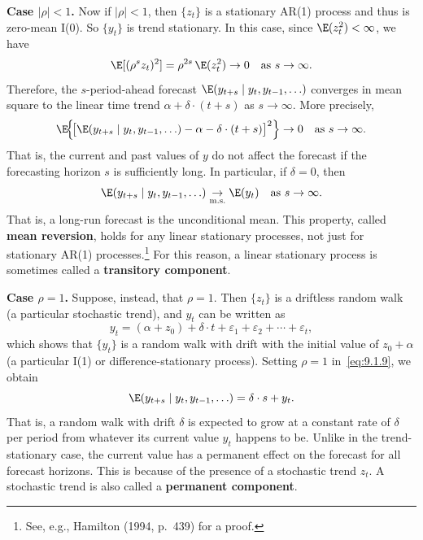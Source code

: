 \begin{enumerate}
\textbf{Case $|\rho| < 1$.} \enspace Now if $|\rho| < 1$, then $\{z_t\}$ is a stationary AR(1) process
and thus is zero-mean I(0). So $\{y_t\}$ is trend stationary. In this case, since
$\E(z_t^2) < \infty$, we have
\[
\E[(\rho^s z_t)^2] = \rho^{2s} \,\E(z_t^2) \to 0 \quad \text{as } s \to \infty.
\]
Therefore, the $s$-period-ahead forecast $\E(y_{t+s} \mid y_t, y_{t-1}, \ldots)$ converges in
mean square to the linear time trend $\alpha + \delta \cdot (t+s)$ as $s \to \infty$. More precisely,
\begin{equation}
\label{eq:9.1.10}
\E\!\Big\{\!\big[\E(y_{t+s} \mid y_t, y_{t-1}, \ldots) - \alpha - \delta \cdot (t+s)\big]^2\Big\} \to 0
\quad \text{as } s \to \infty.
\end{equation}
That is, the current and past values of $y$ do not affect the forecast if the forecasting horizon $s$ is sufficiently long. In particular, if $\delta = 0$, then
\begin{equation}
\label{eq:9.1.11}
\E(y_{t+s} \mid y_t, y_{t-1}, \ldots) \underset{\text{m.s.}}{\to} \E(y_t) \quad \text{as } s \to \infty.
\end{equation}
That is, a long-run forecast is the unconditional mean. This property, called
\textbf{mean reversion}, holds for any linear stationary processes, not just for stationary AR(1) processes.\footnote{See, e.g., Hamilton (1994, p.~439) for a proof.}
For this reason, a linear stationary process is sometimes
called a \textbf{transitory component}.

\textbf{Case $\rho = 1$.} \enspace Suppose, instead, that $\rho = 1$. Then $\{z_t\}$ is a driftless random
walk (a particular stochastic trend), and $y_t$ can be written as
\begin{equation}
\label{eq:9.1.12}
y_t = (\alpha + z_0) + \delta \cdot t + \varepsilon_1 + \varepsilon_2 + \cdots + \varepsilon_t,
\end{equation}
which shows that $\{y_t\}$ is a random walk with drift with the initial value of $z_0 + \alpha$
(a particular I(1) or difference-stationary process). Setting $\rho = 1$ in~\eqref{eq:9.1.9}, we
obtain
\begin{equation}
\label{eq:9.1.13}
\E(y_{t+s} \mid y_t, y_{t-1}, \ldots) = \delta \cdot s + y_t.
\end{equation}
That is, a random walk with drift $\delta$ is expected to grow at a constant rate of
$\delta$ per period from whatever its current value $y_t$ happens to be. Unlike in the
trend-stationary case, the current value has a permanent effect on the forecast
for all forecast horizons. This is because of the presence of a stochastic trend
$z_t$. A stochastic trend is also called a \textbf{permanent component}.


\end{enumerate}

